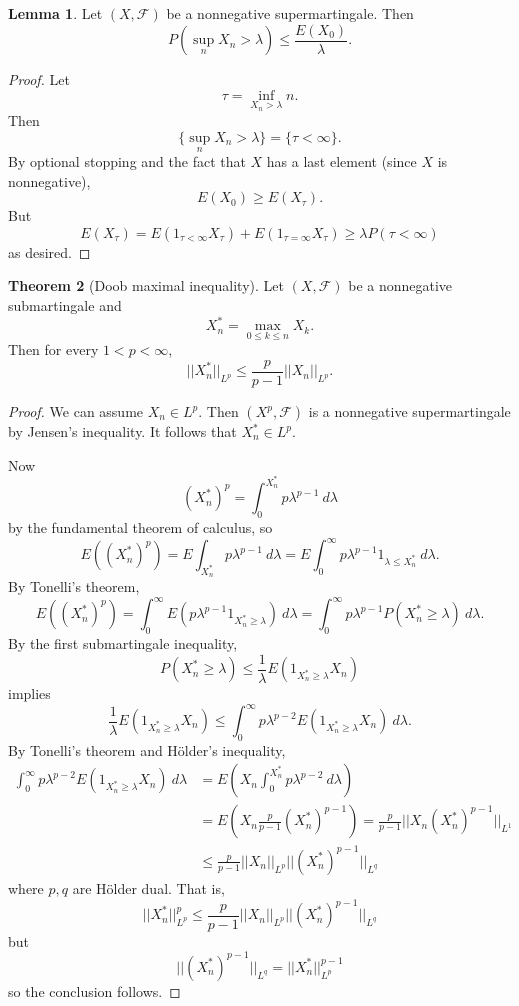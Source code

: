 \documentclass[12pt]{book}
\theoremstyle{definition}
\newtheorem{theorem}{Theorem}[chapter]
\newtheorem{lemma}[theorem]{Lemma}
\begin{document}
\begin{lemma}
Let $(X, \mathcal F)$ be a nonnegative supermartingale.
Then
$$P(\sup_n X_n > \lambda) \leq \frac{E(X_0)}{\lambda}.$$
\end{lemma}
\begin{proof}
Let
$$\tau = \inf_{X_n > \lambda} n.$$
Then
$$\{\sup_n X_n > \lambda\} = \{\tau < \infty\}.$$
By optional stopping and the fact that $X$ has a last element (since $X$ is nonnegative),
$$E(X_0) \geq E(X_\tau).$$
But
$$E(X_\tau) = E(1_{\tau < \infty} X_\tau) + E(1_{\tau = \infty} X_\tau) \geq \lambda P(\tau < \infty)$$
as desired.
\end{proof}

\begin{theorem}[Doob maximal inequality]
Let $(X, \mathcal F)$ be a nonnegative submartingale and
$$X_n^* = \max_{0 \leq k \leq n} X_k.$$
Then for every $1 < p < \infty$,
$$||X_n^*||_{L^p} \leq \frac{p}{p - 1} ||X_n||_{L^p}.$$
\end{theorem}
\begin{proof}
We can assume $X_n \in L^p$.
Then $(X^p, \mathcal F)$ is a nonnegative supermartingale by Jensen's inequality.
It follows that $X^*_n \in L^p$.

Now
$$(X_n^*)^p = \int_0^{X_n^*} p \lambda^{p-1} ~d\lambda$$
by the fundamental theorem of calculus, so
$$E((X_n^*)^p) = E\int_{X_n^*} p\lambda^{p-1} ~d\lambda = E\int_0^\infty p\lambda^{p-1} 1_{\lambda \leq X_n^*} ~d\lambda.$$
By Tonelli's theorem,
$$E((X_n^*)^p) = \int_0^\infty E(p\lambda^{p-1} 1_{X_n^* \geq \lambda}) ~d\lambda = \int_0^\infty p\lambda^{p-1} P(X_n^* \geq \lambda) ~d\lambda.$$
By the first submartingale inequality,
$$P(X_n^* \geq \lambda) \leq \frac{1}{\lambda} E(1_{X_n^* \geq \lambda} X_n)$$
implies
$$\frac{1}{\lambda} E(1_{X_n^* \geq \lambda} X_n) \leq \int_0^\infty p\lambda^{p-2} E(1_{X_n^* \geq \lambda} X_n) ~d\lambda.$$
By Tonelli's theorem and H\"older's inequality,
\begin{align*}\int_0^\infty p\lambda^{p-2} E(1_{X_n^* \geq \lambda} X_n) ~d\lambda &= E\left(X_n \int_0^{X_n^*} p\lambda^{p-2} ~d\lambda\right)\\
&= E\left(X_n \frac{p}{p-1} (X_n^*)^{p-1}\right) = \frac{p}{p - 1} ||X_n(X_n^*)^{p-1}||_{L^1}\\
&\leq \frac{p}{p - 1} ||X_n||_{L^p} ||(X_n^*)^{p-1}||_{L^q}
\end{align*}
where $p,q$ are H\"older dual.
That is,
$$||X_n^*||_{L^p}^p \leq \frac{p}{p - 1} ||X_n||_{L^p} ||(X_n^*)^{p-1}||_{L^q}$$
but
$$||(X_n^*)^{p-1}||_{L^q} = ||X_n^*||_{L^p}^{p-1}$$
so the conclusion follows.
\end{proof}
\end{document}
